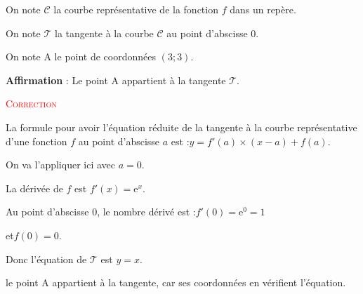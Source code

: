 \documentclass[10pt]{article}
\providecommand{\e}{{\mathrm{e}}}
\begin{document}
\begin{enumerate}
		On note \mbox{$\mathcal{C}$} la courbe représentative de la fonction $f$ dans un repère.

		On note \mbox{$\mathcal{T}$} la tangente à la courbe \mbox{$\mathcal{C}$} au point d'abscisse $0$.

		On note A le point de coordonnées \mbox{$(3;3)$.}

		\vspace{5mm}

		\textbf{Affirmation} : Le point A appartient à la tangente \mbox{$\mathcal{T}$}.


		\textcolor{red}{\textsc{Correction}}

		La formule pour avoir l'équation réduite de la tangente à la courbe représentative d'une fonction $f$ au point d'abscisse $a$ est :\quad $y = f'(a)\times (x - a) + f(a)$.

		On va l'appliquer ici avec $a = 0$.

		La dérivée de $f$ est \quad \mbox{$f'(x)=\e^{x}$}.

		Au point d'abscisse $0$, le nombre dérivé est :\quad $f'(0) = \e^{0} = 1$

		et\quad  $f(0)=0$.

		Donc l'équation de \mbox{$\mathcal{T}$} est \quad \mbox{$y=x$}.

		le point A appartient à la tangente, car ses coordonnées en vérifient l'équation.

		\hfill {}
\end{enumerate}
\end{document}

